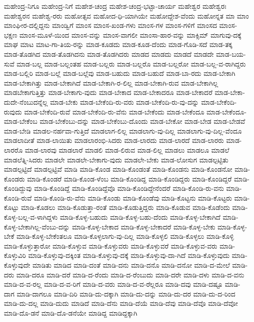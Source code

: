 {ಮಹೇಂದ್ರ-ನಿಗೂ
ಮಹೇಂದ್ರ-ನಿಗೆ
ಮಹೇಶ-ಚಂದ್ರ
ಮಹೇಶ-ಚಂದ್ರ-ಭಟ್ಟಾ-ಚಾರ್ಯ
ಮಹೇಶ್ವರ
ಮಹೇಶ್ವರಃ
ಮಹೇಶ್ವರನ
ಮಹೇಶ್ವ-ರರು
ಮಹೋತ್ಸವ
ಮಹೋದ-ಧಿ-ಯಾಗಿಯೇ
ಮಹೋದ್ದೇಶ-ವೆಂದು
ಮಹೋನ್ನತ
ಮಾ
ಮಾಂ
ಮಾಂಘೀರ-ದಲ್ಲಿದ್ದನು
ಮಾಂಡ್ವಿಗೆ
ಮಾಂಸ
ಮಾಂಸ-ಖಂಡ-ಗಳು
ಮಾಂಸ-ಗಳ
ಮಾಂಸ-ಗಳಿಗೆ
ಮಾಂಸದ
ಮಾಂಸ-ಭಕ್ಷಣ
ಮಾಂಸ-ಮೂಳೆ-ಯಿಂದ
ಮಾಂಸ-ವನ್ನು
ಮಾಂಸ-ವಾಗಲೀ
ಮಾಂಸಾ-ಹಾರ-ವನ್ನು
ಮಾಕ್ಸಿಮ್
ಮಾಗುವು-ದಕ್ಕೆ
ಮಾಘ
ಮಾಟ
ಮಾಟ-ಗಾ-ತಿಯ-ರನ್ನು
ಮಾಡ-ಕೂಡದು
ಮಾಡ-ಕೂಡ-ದೆಂದು
ಮಾಡ-ಗೊಡಿ-ಸದೆ
ಮಾಡ-ತಕ್ಕ
ಮಾಡ-ತೊಡಗಿದ
ಮಾಡ-ತೊಡಗಿದನು
ಮಾಡ-ತೊಡಗಿದರು
ಮಾಡದ
ಮಾಡದು
ಮಾಡದೆ
ಮಾಡದೇ
ಮಾಡ-ಬಯ-ಸುವೆ
ಮಾಡ-ಬಲ್ಲ
ಮಾಡ-ಬಲ್ಲಂತಹ
ಮಾಡ-ಬಲ್ಲರು
ಮಾಡ-ಬಲ್ಲರೊ
ಮಾಡ-ಬಲ್ಲರೋ
ಮಾಡ-ಬಲ್ಲ-ವ-ರಾಗಿದ್ದರು
ಮಾಡ-ಬಲ್ಲಿರಿ
ಮಾಡ-ಬಲ್ಲೆ
ಮಾಡ-ಬಲ್ಲೆವು
ಮಾಡ-ಬಹುದು
ಮಾಡ-ಬಹುದೆ
ಮಾಡ-ಬಾ-ರದು
ಮಾಡ-ಬೇಕಾಗಿ
ಮಾಡ-ಬೇಕಾಗಿತ್ತು
ಮಾಡ-ಬೇಕಾಗಿದೆ
ಮಾಡ-ಬೇಕಾಗಿ-ರ-ಲಿಲ್ಲ
ಮಾಡ-ಬೇಕಾಗಿ-ರುವ
ಮಾಡ-ಬೇಕಾಗಿಲ್ಲ
ಮಾಡಬೇಕಾಗುತ್ತಿತ್ತು
ಮಾಡ-ಬೇಕಾಗು-ವುದು
ಮಾಡ-ಬೇಕಾದ
ಮಾಡ-ಬೇಕಾದರೂ
ಮಾಡ-ಬೇಕಾದರೆ
ಮಾಡ-ಬೇಕಾ-ದುದೇ-ನೆಂಬುದನ್ನೆಲ್ಲ
ಮಾಡ-ಬೇಕು
ಮಾಡ-ಬೇಕೆಂದಿ-ರು-ವರು
ಮಾಡ-ಬೇಕೆಂದಿ-ರು-ವು-ದನ್ನು
ಮಾಡ-ಬೇಕೆಂದಿ-ರುವುದು
ಮಾಡ-ಬೇಕೆಂದಿ-ರುವೆ
ಮಾಡ-ಬೇಕೆಂದಿ-ರು-ವೆನು
ಮಾಡ-ಬೇಕೆಂದು
ಮಾಡ-ಬೇಕೆಂದೂ
ಮಾಡ-ಬೇಕೆಂದೂ-
ಮಾಡ-ಬೇಕೆಂಬ
ಮಾಡ-ಬೇಕೆಂಬು-ದನ್ನು
ಮಾಡ-ಬೇಕೆಂಬು-ದೊಂದು
ಮಾಡ-ಬೇಕೋ
ಮಾಡ-ಬೇಡ
ಮಾಡ-ಬೇಡವೆ
ಮಾಡ-ಬೇಡಿ
ಮಾಡಲ-ನರ್ಹವಾ-ಗುತ್ತಿದೆ
ಮಾಡಲಾಗ-ಲಿಲ್ಲ
ಮಾಡಲಾಗು-ವು-ದಿಲ್ಲ
ಮಾಡಲಾಗು-ವು-ದಿಲ್ಲ-ವೆಂದೂ
ಮಾಡಲಾದೀತೆ
ಮಾಡ-ಲಾಯಿತು
ಮಾಡಲಾರಂಭಿ-ಸಿದರು
ಮಾಡ-ಲಾರದು
ಮಾಡ-ಲಾರದೆ
ಮಾಡ-ಲಾರರು
ಮಾಡ-ಲಾರರೊ
ಮಾಡ-ಲಾರವು
ಮಾಡಲಾರೆ
ಮಾಡಲಿ
ಮಾಡ-ಲಿರುವ
ಮಾಡ-ಲಿಲ್ಲ
ಮಾಡಲು
ಮಾಡಲೂ
ಮಾಡಲೆ
ಮಾಡಲೆತ್ನಿ-ಸಿದರು
ಮಾಡಲೇ
ಮಾಡಲೇ-ಬೇಕಾಗು-ವುದು
ಮಾಡಲೇ-ಬೇಕು
ಮಾಡ-ಲೋಸುಗ
ಮಾಡಲ್ಪಟ್ಟಿತು
ಮಾಡಲ್ಪಟ್ಟಿದೆ
ಮಾಡಲ್ಪಟ್ಟಿವೆ
ಮಾಡಿ
ಮಾಡಿ-ಕೊಂಡ
ಮಾಡಿ-ಕೊಂಡಂತೆ
ಮಾಡಿ-ಕೊಂಡನು
ಮಾಡಿ-ಕೊಂಡನೋ
ಮಾಡಿ-ಕೊಂಡರು
ಮಾಡಿ-ಕೊಂಡರೆ
ಮಾಡಿ-ಕೊಂಡ-ಳೆಂಬ
ಮಾಡಿ-ಕೊಂಡಿದ್ದ
ಮಾಡಿ-ಕೊಂಡಿದ್ದರು
ಮಾಡಿ-ಕೊಂಡಿದ್ದರೆ
ಮಾಡಿ-ಕೊಂಡಿದ್ದುವು
ಮಾಡಿ-ಕೊಂಡಿದ್ದೆ
ಮಾಡಿ-ಕೊಂಡಿದ್ದೆವೊ
ಮಾಡಿ-ಕೊಂಡಿದ್ದೇನೆಂದರೆ
ಮಾಡಿ-ಕೊಂಡಿ-ರು-ವನು
ಮಾಡಿ-ಕೊಂಡಿ-ರುವೆ
ಮಾಡಿ-ಕೊಂಡಿ-ರು-ವೆನು
ಮಾಡಿ-ಕೊಂಡು
ಮಾಡಿ-ಕೊಂಡೆವು
ಮಾಡಿ-ಕೊಟ್ಟನು
ಮಾಡಿ-ಕೊಟ್ಟರು
ಮಾಡಿ-ಕೊಟ್ಟು
ಮಾಡಿ-ಕೊಡಲು
ಮಾಡಿ-ಕೊಡುತ್ತಾ-ರಂತೆ
ಮಾಡಿ-ಕೊಡುತ್ತಿದ್ದರು
ಮಾಡಿ-ಕೊಡುವ
ಮಾಡಿ-ಕೊಡೆಂದು
ಮಾಡಿ-ಕೊಳ್ಳ-ಬಲ್ಲ-ವ-ಳಾಗಿದ್ದಳು
ಮಾಡಿ-ಕೊಳ್ಳ-ಬಹುದು
ಮಾಡಿ-ಕೊಳ್ಳ-ಬಹು-ದೆಂದು
ಮಾಡಿ-ಕೊಳ್ಳ-ಬೇಕಾಗಿದೆ
ಮಾಡಿ-ಕೊಳ್ಳ-ಬೇಕಾಗಿಲ್ಲ-ವೆಂಬು-ದನ್ನು
ಮಾಡಿ-ಕೊಳ್ಳ-ಬೇಕಾದ
ಮಾಡಿ-ಕೊಳ್ಳ-ಬೇಕಾದರೆ
ಮಾಡಿ-ಕೊಳ್ಳ-ಬೇಕು
ಮಾಡಿ-ಕೊಳ್ಳ-ಬೇಕೆ
ಮಾಡಿ-ಕೊಳ್ಳ-ಬೇಕೆಂತಲೂ
ಮಾಡಿ-ಕೊಳ್ಳಲಾಗು-ವು-ದಿಲ್ಲ
ಮಾಡಿ-ಕೊಳ್ಳಲಿ
ಮಾಡಿ-ಕೊಳ್ಳಲು
ಮಾಡಿ-ಕೊಳ್ಳಿ
ಮಾಡಿ-ಕೊಳ್ಳುತ್ತಾರೋ
ಮಾಡಿ-ಕೊಳ್ಳುವ
ಮಾಡಿ-ಕೊಳ್ಳುವರು
ಮಾಡಿ-ಕೊಳ್ಳುವರೆ
ಮಾಡಿ-ಕೊಳ್ಳುವ-ವರು
ಮಾಡಿ-ಕೊಳ್ಳುವಿರಿ
ಮಾಡಿ-ಕೊಳ್ಳುವು-ದಕ್ಕಿಂತ
ಮಾಡಿ-ಕೊಳ್ಳುವು-ದಕ್ಕೆ
ಮಾಡಿ-ಕೊಳ್ಳುವು-ದಾ-ಗಿದೆ
ಮಾಡಿ-ಕೊಳ್ಳುವುದು
ಮಾಡಿ-ಕೊಳ್ಳುವುದೇ
ಮಾಡಿತು
ಮಾಡಿದ
ಮಾಡಿ-ದಂತೆ
ಮಾಡಿ-ದನು
ಮಾಡಿ-ದನೊ
ಮಾಡಿ-ದನೋ
ಮಾಡಿ-ದ-ಮೇಲೆ
ಮಾಡಿ-ದರು
ಮಾಡಿ-ದರೂ
ಮಾಡಿ-ದರೆ
ಮಾಡಿ-ದ-ರೆಂದು
ಮಾಡಿ-ದ-ರೆಂಬುದು
ಮಾಡಿ-ದರೇ
ಮಾಡಿ-ದಳು
ಮಾಡಿ-ದ-ವನು
ಮಾಡಿ-ದ-ವ-ರಲ್ಲ
ಮಾಡಿ-ದ-ವ-ರಿಗೆ
ಮಾಡಿ-ದ-ವರು
ಮಾಡಿ-ದ-ವ-ರೆಲ್ಲರೂ
ಮಾಡಿ-ದವು
ಮಾಡಿ-ದಷ್ಟೂ
ಮಾಡಿ-ದಾಗ
ಮಾಡಿ-ದಾಗಲೂ
ಮಾಡಿ-ದಿರಿ
ಮಾಡಿ-ದು-ದಕ್ಕಾಗಿ
ಮಾಡಿ-ದು-ದನ್ನು
ಮಾಡಿ-ದು-ದರ
ಮಾಡಿ-ದು-ದ-ರಿಂದ
ಮಾಡಿ-ದು-ದಲ್ಲ
ಮಾಡಿ-ದುದು
ಮಾಡಿದೆ
ಮಾಡಿ-ದೆನು
ಮಾಡಿ-ದೆಯೆ
ಮಾಡಿ-ದೆವು
ಮಾಡಿ-ದೆವೊ
ಮಾಡಿ-ದೆವೋ
ಮಾಡಿ-ದೊ-ಡನೆ
ಮಾಡಿ-ದೊ-ಡನೆಯೇ
ಮಾಡಿದ್ದ
ಮಾಡಿದ್ದಕ್ಕಾಗಿ
}
